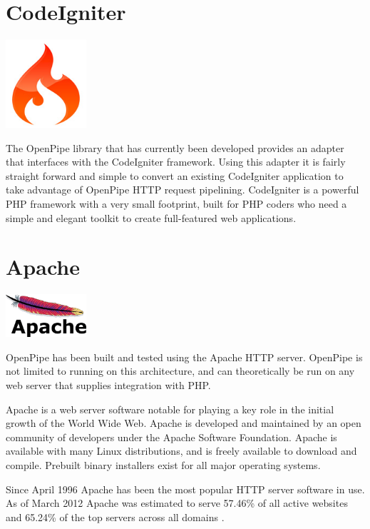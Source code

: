 \documentclass[12pt]{report}
\begin{document}
\section{CodeIgniter}
\begin{center}
\includegraphics[width=30mm]{figures/images/ci_logo.jpg}
\end{center}

The OpenPipe library that has currently been developed provides an adapter that interfaces with the CodeIgniter framework. Using this adapter it is fairly straight forward and simple to convert an existing CodeIgniter application to take advantage of OpenPipe HTTP request pipelining. CodeIgniter is a powerful PHP framework with a very small footprint, built for PHP coders who need a simple and elegant toolkit to create full-featured web applications. 


\section{Apache}
\begin{center} 
\includegraphics[width=30mm]{figures/images/apache_logo.png}
\end{center}

OpenPipe has been built and tested using the Apache HTTP server. OpenPipe is not limited to running on this architecture, and can theoretically be run on any web server that supplies integration with PHP.

Apache is a web server software notable for playing a key role in the initial growth of the World Wide Web. Apache is developed and maintained by an open community of developers under the Apache Software Foundation. Apache is available with many Linux distributions, and is freely available to download and compile. Prebuilt binary installers exist for all major operating systems.  

Since April 1996 Apache has been the most popular HTTP server software in use. As of March 2012 Apache was estimated to serve 57.46\% of all active websites and 65.24\% of the top servers across all domains \cite{webserverSurvey}.
\end{document}
